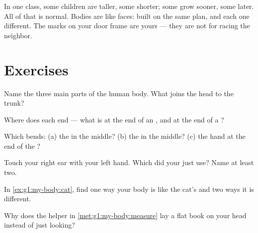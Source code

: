 \begin{remark}\label{rem:g1:my-body:different}
In one class, some children are taller, some shorter; some grow
sooner, some later. All of that is normal. Bodies are like faces:
built on the same plan, and each one different. The marks on your
door frame are yours --- they are not for racing the neighbor.
\end{remark}

\section{Exercises}

\begin{exercise}[$\star$]\label{exo:g1:my-body:1}
Name the three main parts of the human body. What joins the head
to the trunk?
\end{exercise}

\begin{exercise}[$\star$]\label{exo:g1:my-body:2}
Where does each  end --- what is at the end of an , and at
the end of a ?
\end{exercise}

\begin{exercise}[$\star$]\label{exo:g1:my-body:3}
Which  bends: (a) the  in the middle? (b) the  in the
middle? (c) the hand at the end of the ?
\end{exercise}

\begin{exercise}[$\star$]\label{exo:g1:my-body:4}
Touch your right ear with your left hand. Which  did your
 just use? Name at least two.
\end{exercise}

\begin{exercise}[$\star$]\label{exo:g1:my-body:5}
In \cref{ex:g1:my-body:cat}, find one way your body is like the
cat's and two ways it is different.
\end{exercise}

\begin{exercise}[$\star$]\label{exo:g1:my-body:6}
Why does the helper in \cref{met:g1:my-body:measure} lay a flat
book on your head instead of just looking?
\end{exercise}

